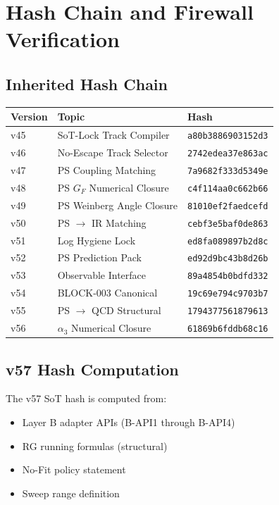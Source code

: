 \documentclass[11pt,a4paper]{article}
\theoremstyle{definition}
\begin{document}
\section{Hash Chain and Firewall Verification}
\label{sec:hash-chain}

\subsection{Inherited Hash Chain}
\label{subsec:inherited-chain}

\begin{hashbox}
\begin{tabular}{lll}
\toprule
Version & Topic & Hash \\
\midrule
v45 & SoT-Lock Track Compiler & \texttt{a80b3886903152d3} \\
v46 & No-Escape Track Selector & \texttt{2742edea37e863ac} \\
v47 & PS Coupling Matching & \texttt{7a9682f333d5349e} \\
v48 & PS $G_F$ Numerical Closure & \texttt{c4f114aa0c662b66} \\
v49 & PS Weinberg Angle Closure & \texttt{81010ef2faedcefd} \\
v50 & PS $\to$ IR Matching & \texttt{cebf3e5baf0de863} \\
v51 & Log Hygiene Lock & \texttt{ed8fa089897b2d8c} \\
v52 & PS Prediction Pack & \texttt{ed92d9bc43b8d26b} \\
v53 & Observable Interface & \texttt{89a4854b0bdfd332} \\
v54 & BLOCK-003 Canonical & \texttt{19c69e794c9703b7} \\
v55 & PS $\to$ QCD Structural & \texttt{1794377561879613} \\
v56 & $\alpha_3$ Numerical Closure & \texttt{61869b6fddb68c16} \\
\bottomrule
\end{tabular}
\end{hashbox}

\subsection{v57 Hash Computation}
\label{subsec:v57-hash}

The v57 SoT hash is computed from:
\begin{itemize}
  \item Layer B adapter APIs (B-API1 through B-API4)
  \item RG running formulas (structural)
  \item No-Fit policy statement
  \item Sweep range definition
\end{itemize}
\end{document}

